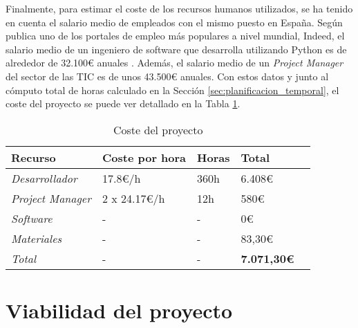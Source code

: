 \bigskip
Finalmente, para estimar el coste de los recursos
humanos utilizados, se ha tenido en cuenta el salario medio de empleados con el mismo puesto en España. Según publica
uno de los portales de empleo más populares a nivel mundial, Indeed, el salario medio de un ingeniero de software que desarrolla
utilizando Python es de alrededor de 32.100€ anuales \cite{indeedsalario}. Además, el salario medio de un \textit{Project Manager}
del sector de las TIC es de unos 43.500€ anuales. Con estos datos y junto al cómputo total de horas calculado en la Sección \ref{sec:planificacion_temporal},
el coste del proyecto se puede ver detallado en la Tabla \ref{tab:costes}.

\bigskip
\begin{table}[H]
	\centering
	\begin{tabular}{|l|l|l|l|l|}
		\rowcolor{udcpink!25}
		\hline
		\small \textbf{Recurso} & \small \textbf{Coste por hora} & \small \textbf{Horas} & \small \textbf{Total} \\ \hline
		\small \textit{Desarrollador} & \small 17.8€/h & \small 360h & \small 6.408€ \\ \hline
		\small \textit{Project Manager} & \small 2 x 24.17€/h & \small 12h & \small 580€ \\ \hline
		\small \textit{Software} & \small - & \small - & \small 0€ \\ \hline
		\small \textit{Materiales} & \small - & \small - & \small 83,30€ \\ \hline
		\small \textit{Total} & \small - & \small - & \small \textbf{7.071,30€} \\ \hline
	\end{tabular}
	\caption{Coste del proyecto}
	\label{tab:costes}
\end{table}

\section{Viabilidad del proyecto}
